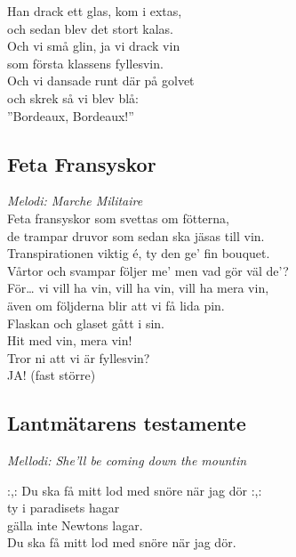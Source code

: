 \documentclass[a5paper]{article}
\begin{document}
		\noindent 
		Han drack ett glas, kom i extas, \\
		och sedan blev det stort kalas. \\
		Och vi små glin, ja vi drack vin \\
		som första klassens fyllesvin. \\
		Och vi dansade runt där på golvet \\
		och skrek så vi blev blå:\\
		”Bordeaux, Bordeaux!” \\

		\subsection{Feta Fransyskor}
		\textit{Melodi: Marche Militaire} \\
		
		\noindent
		Feta fransyskor som svettas om fötterna, \\
		de trampar druvor som sedan ska jäsas till vin. \\
		Transpirationen viktig é, ty den ge’ fin bouquet. \\
		Vårtor och svampar följer me’ men vad gör väl de’? \\
		
		\noindent
		För… vi vill ha vin, vill ha vin, vill ha mera vin, \\
		även om följderna blir att vi få lida pin. \\
		Flaskan och glaset gått i sin. \\
		Hit med vin, mera vin! \\
		Tror ni att vi är fyllesvin? \\
		JA! (fast större) \\
				
		\newpage
		
		
\subsection{Lantmätarens testamente}
\textit{Mellodi: She'll be coming down the mountin} \\

\noindent

\noindent
:,: Du ska få mitt lod med snöre när jag dör :,: \\
ty i paradisets hagar \\
gälla inte Newtons lagar.\\
Du ska få mitt lod med snöre när jag dör. \\
\end{document}
